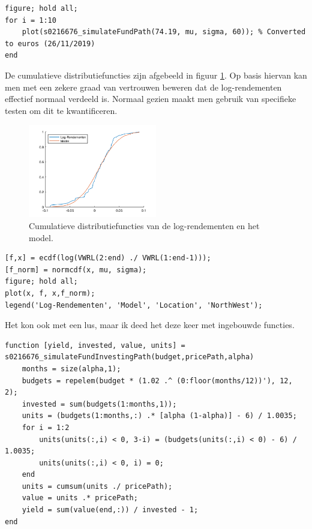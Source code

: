 \begin{lstlisting}
figure; hold all;
for i = 1:10
    plot(s0216676_simulateFundPath(74.19, mu, sigma, 60)); % Converted to euros (26/11/2019)
end
\end{lstlisting}



De cumulatieve distributiefuncties zijn afgebeeld in figuur \ref{fig:op7}. Op basis hiervan kan men met een zekere graad van vertrouwen beweren dat de log-rendementen effectief normaal verdeeld is. Normaal gezien maakt men gebruik van specifieke testen om dit te kwantificeren.

\begin{figure}[h]
\centering
\includegraphics[width=0.5\textwidth]{res/op7.png}
\caption{Cumulatieve distributiefuncties van de log-rendementen en het model.}
\label{fig:op7}
\end{figure}

\begin{lstlisting}
[f,x] = ecdf(log(VWRL(2:end) ./ VWRL(1:end-1)));
[f_norm] = normcdf(x, mu, sigma);
figure; hold all;
plot(x, f, x,f_norm);
legend('Log-Rendementen', 'Model', 'Location', 'NorthWest');
\end{lstlisting}



Het kon ook met een lus, maar ik deed het deze keer met ingebouwde functies. 

\begin{lstlisting}
function [yield, invested, value, units] = s0216676_simulateFundInvestingPath(budget,pricePath,alpha)
    months = size(alpha,1);
    budgets = repelem(budget * (1.02 .^ (0:floor(months/12))'), 12, 2);
    invested = sum(budgets(1:months,1));
    units = (budgets(1:months,:) .* [alpha (1-alpha)] - 6) / 1.0035;
    for i = 1:2
        units(units(:,i) < 0, 3-i) = (budgets(units(:,i) < 0) - 6) / 1.0035;
        units(units(:,i) < 0, i) = 0;
    end
    units = cumsum(units ./ pricePath);
    value = units .* pricePath;
    yield = sum(value(end,:)) / invested - 1;
end
\end{lstlisting}

